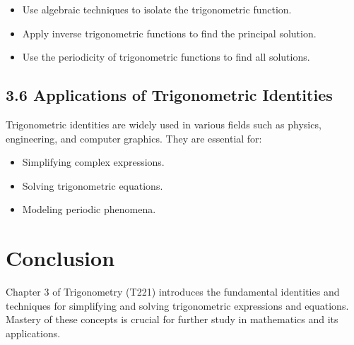 \documentclass[12pt]{article}
\begin{document}
\begin{itemize}
    \item Use algebraic techniques to isolate the trigonometric function.
    \item Apply inverse trigonometric functions to find the principal solution.
    \item Use the periodicity of trigonometric functions to find all solutions.
\end{itemize}

\subsection*{3.6 Applications of Trigonometric Identities}
Trigonometric identities are widely used in various fields such as physics, engineering, and computer graphics. They are essential for:

\begin{itemize}
    \item Simplifying complex expressions.
    \item Solving trigonometric equations.
    \item Modeling periodic phenomena.
\end{itemize}

\section*{Conclusion}
Chapter 3 of Trigonometry (T221) introduces the fundamental identities and techniques for simplifying and solving trigonometric expressions and equations. Mastery of these concepts is crucial for further study in mathematics and its applications.
\end{document}
